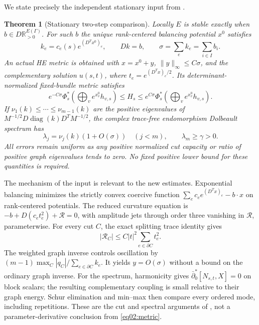 \documentclass[11pt]{amsart}
\newtheorem{theorem}{Theorem}[section]
\theoremstyle{definition}
\theoremstyle{remark}
\newcommand{\RR}{\mathbb R}
\newcommand{\db}{\bar\partial}
\newcommand{\diag}{\operatorname{diag}}
\begin{document}
We state precisely the independent stationary input from
\cite[Theorem~1.1]{wuebben2026uniform}.

\begin{theorem}[Stationary two-step comparison]\label{thm02:stationary}
Locally \(E\) is stable exactly when \(b\in D\RR_{>0}^{E(\Gamma)}\).
For such \(b\) the unique rank-centered balancing potential \(x^0\)
satisfies
\begin{equation}\label{eq02:balance}
 k_e=c_e(s)e^{(D^Tx^0)_e},\qquad Dk=b,
 \qquad\sigma=\sum_ek_e=\sum_{i\in I}b_i.
\end{equation}
An actual HE metric is obtained with \(x=x^0+y\),
\(\|y\|_\infty\le C\sigma\), and the complementary solution
\(u(s,t)\), where \(t_e=e^{(D^Tx)_e/2}\).
Its determinant-normalized fixed-bundle metric satisfies
\begin{equation}\label{eq02:metric}
 e^{-C\sigma}\Phi_s^*\!\left(\bigoplus_ve^{x_v^0}h_{v,s}\right)
 \le H_s\le
 e^{C\sigma}\Phi_s^*\!\left(\bigoplus_ve^{x_v^0}h_{v,s}\right).
\end{equation}
If \(\nu_1(k)\le\cdots\le\nu_{m-1}(k)\) are the positive
eigenvalues of \(M^{-1/2}D\diag(k)D^TM^{-1/2}\), the complex
trace-free endomorphism Dolbeault spectrum has
\begin{equation}\label{eq02:spectrum}
 \lambda_j=\nu_j(k)(1+O(\sigma))\quad(j<m),\qquad
 \lambda_m\ge\gamma>0.
\end{equation}
All errors remain uniform as any positive normalized cut capacity
or ratio of positive graph eigenvalues tends to zero. No fixed
positive lower bound for these quantities is required.
\end{theorem}

The mechanism of the input is relevant to the new estimates. Exponential
balancing minimizes the strictly convex coercive function
\(\sum_ec_e e^{(D^Tx)_e}-b\cdot x\) on rank-centered potentials.
The reduced curvature equation is
\(-b+D(c_et_e^2)+\mathcal R=0\), with amplitude jets through order
three vanishing in \(\mathcal R\), parameterwise. For every cut
\(C\), the exact splitting trace identity gives
\[
 |\mathcal R_C|\le C|t|^2\sum_{e\in\partial C}t_e^2.
\]
The weighted graph inverse controls oscillation by
\( (m-1)\max_C |q_C|/\sum_{e\in\partial C}k_e\).
It yields \(y=O(\sigma)\) without a bound on the ordinary graph
inverse. For the spectrum, harmonicity gives
\(\db_0^*[N_{s,t},X]=0\) on block scalars; the resulting
complementary coupling is small relative to their graph energy.
Schur elimination and min--max then compare every ordered mode,
including repetitions. These are the cut and spectral arguments of
\cite[\S\S3--5]{wuebben2026uniform}, not a parameter-derivative
conclusion from \eqref{eq02:metric}.
\end{document}
